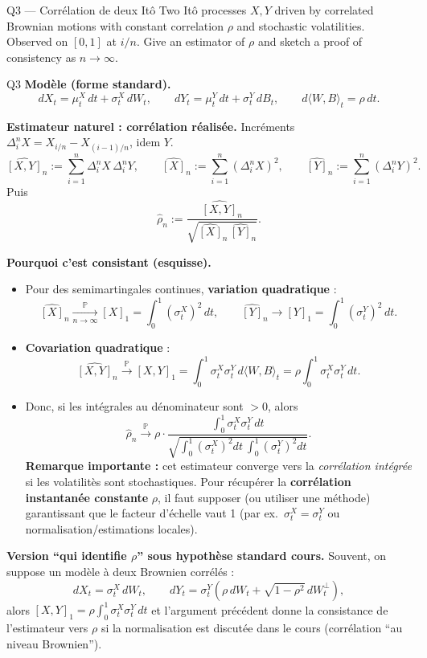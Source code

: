 \begin{questionbox}{Q3 --- Corrélation de deux Itô}
Two Itô processes $X,Y$ driven by correlated Brownian motions with constant correlation $\rho$ and stochastic volatilities. Observed on $[0,1]$ at $i/n$. Give an estimator of $\rho$ and sketch a proof of consistency as $n\to\infty$.
\end{questionbox}

\begin{solutionbox}{Q3}
\textbf{Modèle (forme standard).}
\[
dX_t=\mu^X_t\,dt+\sigma^X_t\,dW_t,\qquad
dY_t=\mu^Y_t\,dt+\sigma^Y_t\,dB_t,\qquad
d\langle W,B\rangle_t=\rho\,dt.
\]

\medskip
\textbf{Estimateur naturel : corrélation réalisée.} Incréments $\Delta_i^n X=X_{i/n}-X_{(i-1)/n}$, idem $Y$.
\[
\widehat{[X,Y]}_n := \sum_{i=1}^n \Delta_i^n X\,\Delta_i^n Y,\qquad
\widehat{[X]}_n := \sum_{i=1}^n (\Delta_i^n X)^2,\qquad
\widehat{[Y]}_n := \sum_{i=1}^n (\Delta_i^n Y)^2.
\]
Puis
\[
\hat\rho_n := \frac{\widehat{[X,Y]}_n}{\sqrt{\widehat{[X]}_n\,\widehat{[Y]}_n}}.
\]

\medskip
\textbf{Pourquoi c'est consistant (esquisse).}
\begin{itemize}[leftmargin=*]
  \item Pour des semimartingales continues, \textbf{variation quadratique} :
  \[
  \widehat{[X]}_n \xrightarrow[n\to\infty]{\mathbb{P}} [X]_1=\int_0^1 (\sigma^X_t)^2\,dt,\qquad
  \widehat{[Y]}_n \to [Y]_1=\int_0^1 (\sigma^Y_t)^2\,dt.
  \]
  \item \textbf{Covariation quadratique} :
  \[
  \widehat{[X,Y]}_n \xrightarrow{\mathbb{P}} [X,Y]_1=\int_0^1 \sigma^X_t\sigma^Y_t\,d\langle W,B\rangle_t
  =\rho\int_0^1 \sigma^X_t\sigma^Y_t\,dt.
  \]
  \item Donc, si les intégrales au dénominateur sont $>0$, alors
  \[
  \hat\rho_n \xrightarrow{\mathbb{P}} \rho\cdot
  \frac{\int_0^1 \sigma^X_t\sigma^Y_t\,dt}{\sqrt{\int_0^1(\sigma^X_t)^2dt\ \int_0^1(\sigma^Y_t)^2dt}}.
  \]
  \textbf{Remarque importante :} cet estimateur converge vers la \emph{corrélation intégrée} si les volatilitès sont stochastiques. Pour récupérer la \textbf{corrélation instantanée constante} $\rho$, il faut supposer (ou utiliser une méthode) garantissant que le facteur d'échelle vaut 1 (par ex.\ $\sigma^X_t=\sigma^Y_t$ ou normalisation/estimations locales).
\end{itemize}

\medskip
\textbf{Version ``qui identifie $\rho$'' sous hypothèse standard cours.} Souvent, on suppose un modèle à deux Brownien corrélés :
\[
dX_t=\sigma^X_t\,dW_t,\qquad dY_t=\sigma^Y_t(\rho\,dW_t+\sqrt{1-\rho^2}\,dW_t^\perp),
\]
alors $[X,Y]_1=\rho\int_0^1\sigma^X_t\sigma^Y_t\,dt$ et l'argument précédent donne la consistance de l'estimateur vers $\rho$ si la normalisation est discutée dans le cours (corrélation ``au niveau Brownien'').
\end{solutionbox}

